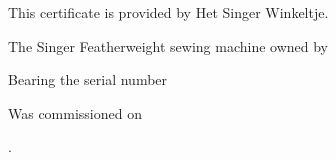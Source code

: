 \documentclass[a4paper]{article}
\begin{document}
\pagecolor{bg}

\begin{center}
\end{center}

\vspace{1cm}

\begin{center}
\end{center}


\def\setverb{\def\do##1{\catcode`##1=12}\dospecials }
\def\verbinput#1{\bgroup \setverb \unskip\egroup}

\begin{center}

\vspace{1cm}

This certificate is provided by Het Singer Winkeltje.

\vspace{2cm}

The Singer Featherweight sewing machine owned by

\vspace{0.3cm}%
{\Large \verbinput{name.txt}}%
\vspace{1cm}

Bearing the serial number

\vspace{0.3cm}%
{\Large \verbinput{serial.txt}}%
\vspace{1cm}

Was commissioned on

\vspace{0.3cm}%
{\Large \verbinput{date.txt}}.%
\vspace{1cm}

\end{center}
\end{document}
